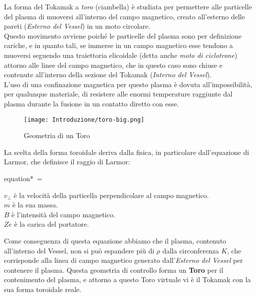 \noindent
La forma del Tokamak a \textit{toro} (ciambella) è studiata per permettere alle particelle del plasma di muoversi all'interno del campo magnetico, creato all'esterno delle pareti (\textit{Esterno del Vessel}) in un moto circolare.\\
Questo movimento avviene poiché le particelle del plasma sono per definizione cariche, e in quanto tali, se immerse in un campo magnetico esse tendono a muoversi seguendo una traiettoria elicoidale (detta anche \textit{moto di ciclotrone}) attorno alle linee del campo magnetico, che in questo caso sono chiuse e contenute all'interno della sezione del Tokamak (\textit{Interno del Vessel}).\\
L'uso di una confinazione magnetica per questo plasma è dovuta all'impossibilità, per qualunque materiale, di resistere alle enormi temperature raggiunte dal plasma durante la fusione in un contatto diretto con esse.
\begin{figure}[H]
	\centering
	\caption[Geometria di un Toro]{Geometria di un Toro}
	\texttt{[image: Introduzione/toro-big.png]}
\end{figure}\vspace{-8mm}
\noindent
La scelta della forma toroidale deriva dalla fisica, in particolare dall'equazione di Larmor, che definisce il raggio di Larmor:\\
\begin{vwcol}[widths={0.3,0.7}, sep=8mm, rule=1px]
	\begin{empheq}[box=\mathCalc]{equation*} \label{eq:Larmor}
		{\displaystyle \,\rho ={}}
	\end{empheq}
	\newpage %
	\begin{spacing}{1.25}
		{\footnotesize
			$ {\displaystyle v_{\perp }} $ è la velocità della particella perpendicolare al campo magnetico.\\
			$ {\displaystyle m} $ è la sua massa.\\
			$ {\displaystyle B} $ è l'intensità del campo magnetico.\\
			$ {\displaystyle Ze} $ è la carica del portatore.
		}
	\end{spacing}
\end{vwcol}
\noindent
Come conseguenza di questa equazione abbiamo che il plasma, contenuto all'interno del Vessel, non si può espandere più di $ {\displaystyle \rho } $ dalla circonferenza $ K $, che corrisponde alla linea di campo magnetico generato dall'\textit{Esterno del Vessel} per contenere il plasma. Questa geometria di controllo forma un \textbf{Toro} per il contenimento del plasma, e attorno a questo Toro virtuale vi è il Tokamak con la sua forma toroidale reale.\\
